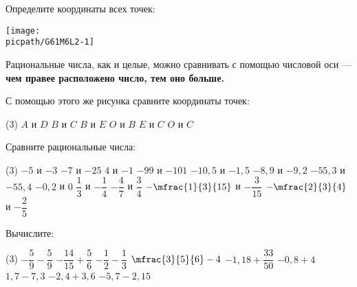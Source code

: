 \begin{class}[number=2]
	\begin{listofex}
		\item
		\begin{minipage}[t]{\bodywidth}
			Определите координаты всех точек:
		\end{minipage}
		\begin{minipage}[c]{0.45\textwidth}
			\texttt{[image: \\picpath/G61M6L2-1]}
		\end{minipage}
	\end{listofex}
	\begin{definit}
		Рациональные числа, как и целые, можно сравнивать с помощью числовой оси --- \textbf{чем правее расположено число, тем оно больше.}
	\end{definit}
	\begin{listofex}[resume]
		\item С помощью этого же рисунка сравните координаты точек:
		\begin{tasks}(3)
			\task \( A \) и \( D \)
			\task \( B \) и \( C \)
			\task \( B \) и \( E \)
			\task \( O \) и \( B \)
			\task \( E \) и \( C \)
			\task \( O \) и \( C \)
		\end{tasks}
		\item Сравните рациональные числа:
		\begin{tasks}(3)
			\task \( -5 \) и \( -3 \)
			\task \( -7 \) и \( -25 \)
			\task \( 4 \) и \( -1 \)
			\task \( -99 \) и \( -101 \)
			\task \( -10,5 \) и \( -1,5 \)
			\task \( -8,9 \) и \( -9,2 \)
			\task \( -55,3 \) и \( -55,4 \)
			\task \( -0,2 \) и \( 0 \)
			\task \( \dfrac{1}{3} \) и \( -\dfrac{1}{4} \)
			\task \(- \dfrac{4}{7} \) и \( \dfrac{3}{4} \)
			\task \(- \mfrac{1}{3}{15} \) и \( -\dfrac{3}{15} \)
			\task \( -\mfrac{2}{3}{4} \) и \( -\dfrac{2}{5} \)
		\end{tasks}
		\item Вычислите:
		\begin{tasks}(3)
			\task \( -\dfrac{5}{9}-\dfrac{5}{9} \)
			\task \( -\dfrac{14}{15}+\dfrac{5}{6} \)
			\task \( -\dfrac{1}{2}-\dfrac{1}{3} \)
			\task \( \mfrac{3}{5}{6}-4 \)
			\task \( -1,18+\dfrac{33}{50} \)
			\task \( -0,8+4 \)
			\task \( 1,7-7,3 \)
			\task \( -2,4+3,6 \)
			\task \( -5,7-2,15 \)
		\end{tasks}
	\end{listofex}
\end{class}

